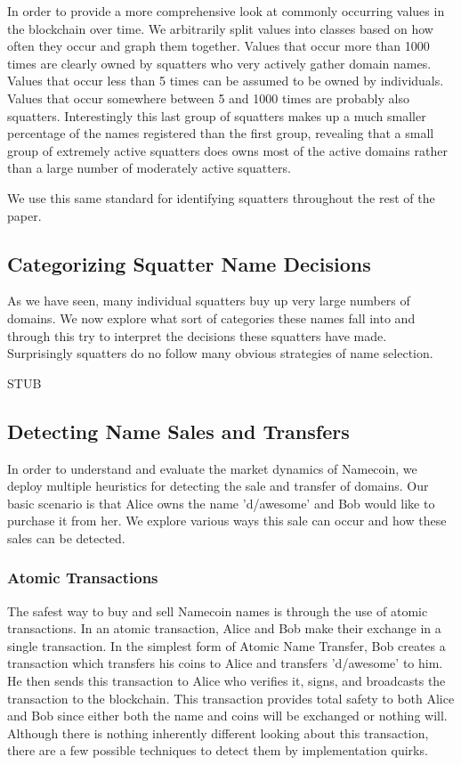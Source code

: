 In order to provide a more comprehensive look at commonly occurring values in the blockchain over time. We arbitrarily split values into classes based on how often they occur and graph them together. Values that occur more than 1000 times are clearly owned by squatters who very actively gather domain names. Values that occur less than 5 times can be assumed to be owned by individuals. Values that occur somewhere between 5 and 1000 times are probably also squatters. Interestingly this last group of squatters makes up a much smaller percentage of the names registered than the first group, revealing that a small group of extremely active squatters does owns most of the active domains rather than a large number of moderately active squatters.

We use this same standard for identifying squatters throughout the rest of the paper.

\subsection{Categorizing Squatter Name Decisions}

As we have seen, many individual squatters buy up very large numbers of domains. We now explore what sort of categories these names fall into and through this try to interpret the decisions these squatters have made. Surprisingly squatters do no follow many obvious strategies of name selection.

STUB

\subsection{Detecting Name Sales and Transfers}

In order to understand and evaluate the market dynamics of Namecoin, we deploy multiple heuristics for detecting the sale and transfer of domains. Our basic scenario is that Alice owns the name 'd/awesome' and Bob would like to purchase it from her. We explore various ways this sale can occur and how these sales can be detected.

\subsubsection{Atomic Transactions}

The safest way to buy and sell Namecoin names is through the use of atomic transactions. In an atomic transaction, Alice and Bob make their exchange in a single transaction. In the simplest form of Atomic Name Transfer, Bob creates a transaction which transfers his coins to Alice and transfers 'd/awesome' to him. He then sends this transaction to Alice who verifies it, signs, and broadcasts the transaction to the blockchain. This transaction provides total safety to both Alice and Bob since either both the name and coins will be exchanged or nothing will. Although there is nothing inherently different looking about this transaction, there are a few possible techniques to detect them by implementation quirks.

